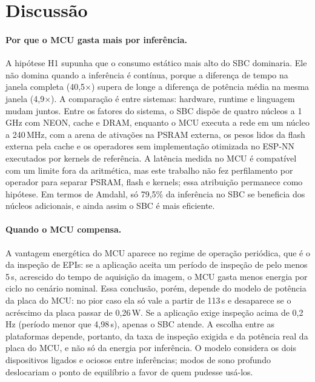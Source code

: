 \documentclass[11pt,a4paper]{article}
\begin{document}
\section{Discussão}

\paragraph{Por que o MCU gasta mais por inferência.} A hipótese H1 supunha que o consumo estático mais alto do SBC
dominaria. Ele não domina quando a inferência é contínua, porque a diferença de tempo na janela completa
(40,5$\times$) supera de longe a diferença de potência média na mesma janela (4,9$\times$). A comparação é entre sistemas: hardware, runtime
e linguagem mudam juntos. Entre os fatores do sistema, o SBC dispõe de quatro núcleos a 1\,GHz com NEON, cache e
DRAM, enquanto o MCU executa a rede em um núcleo a 240\,MHz, com a arena de ativações na PSRAM externa, os pesos
lidos da flash externa pela cache e os operadores sem implementação otimizada no ESP-NN executados por
kernels de referência. A latência medida no MCU é compatível com um limite fora da aritmética, mas este
trabalho não fez perfilamento por operador para separar PSRAM, flash e kernels; essa atribuição permanece como
hipótese. Em termos de Amdahl, só 79,5\% da inferência no SBC se beneficia dos núcleos adicionais, e ainda assim o
SBC é mais eficiente.

\paragraph{Quando o MCU compensa.} A vantagem energética do MCU aparece no regime de operação periódica, que é o
da inspeção de EPIs: se a aplicação aceita um período de inspeção de pelo menos 5\,s, acrescido do tempo de aquisição da
imagem, o MCU gasta menos energia por ciclo no cenário nominal. Essa conclusão, porém, depende do modelo de potência da
placa do MCU: no pior caso ela só vale a partir de 113\,s e desaparece se o acréscimo da placa passar de 0,26\,W.
Se a aplicação exige inspeção acima de 0,2\,Hz (período menor que 4,98\,s), apenas o SBC atende. A escolha entre as plataformas depende,
portanto, da taxa de inspeção exigida e da potência real da placa do MCU, e não só da energia por inferência. O
modelo considera os dois dispositivos ligados e ociosos entre inferências; modos de sono profundo deslocariam o
ponto de equilíbrio a favor de quem pudesse usá-los.
\end{document}
